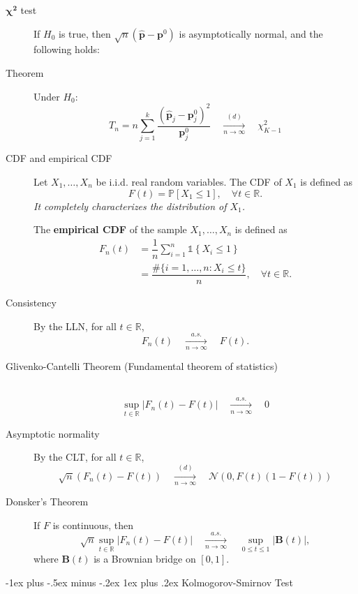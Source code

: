 \documentclass[a4paper, 10pt,landscape]{article}
\makeatletter
\renewcommand{\subsubsection}{\@startsection{subsubsection}{3}{0mm}%
                                {-1ex plus -.5ex minus -.2ex}%
                                {1ex plus .2ex}%
                                {\normalfont\small\bfseries}}
\makeatother
\begin{document}
\begin{multicols*}{3}
\begin{description}
\begin{itemize}
	\end{itemize}
	\item[$\mathbf{\chi^2}$ test] If $H_0$ is true, then $\sqrt{n}\left(\widehat{\mathbf{p}}-\mathbf{p}^0\right)$ is asymptotically normal, and the following holds:
	\item[Theorem] Under $H_0$:
	$$T_n=n\sum_{j=1}^{k}\dfrac{\left(\widehat{\mathbf{p}}_j-\mathbf{p}_j^0\right)^2}{\mathbf{p}_j^0}\quad\xrightarrow[n\rightarrow\infty]{(d)}\quad\chi_{K-1}^2$$
	\item[CDF and empirical CDF] Let $X_1,\dots,X_n$ be i.i.d. real random variables. The CDF of $X_1$ is defined as
	$$F(t)=\mathbb{P}\left[X_1\leq1\right],\quad\forall t\in\mathbb{R}.$$
	{\it It completely characterizes the distribution of $X_1$.}
	
	The {\bf empirical CDF} of the sample $X_1,\dots,X_n$ is defined as
	\begin{align*}
		F_n(t)&=\dfrac{1}{n}\sum_{i=1}^{n}\mathds{1}\left\{X_i\leq 1\right\}\\
		&=\dfrac{\#\{i=1,\dots,n:X_i\leq t\}}{n},\quad\forall t\in\mathbb{R}.
	\end{align*}
	\item[Consistency] By the LLN, for all $t\in\mathbb{R}$,
	$$F_n(t)\quad\xrightarrow[n\rightarrow\infty]{a.s.}\quad F(t).$$
	\item[Glivenko-Cantelli Theorem (Fundamental theorem of statistics)] ~
	$$\sup\limits_{t\in\mathbb{R}}\left|F_n(t)-F(t)\right|\quad\xrightarrow[n\rightarrow\infty]{a.s.}\quad0$$
	\item[Asymptotic normality] By the CLT, for all $t\in\mathbb{R}$,
	$$\sqrt{n}\left(F_n(t)-F(t)\right)\quad\xrightarrow[n\rightarrow\infty]{(d)}\quad\mathcal{N}\left(0,F(t)\left(1-F(t)\right)\right)$$
	\item[Donsker's Theorem] If $F$ is continuous, then
	$$\sqrt{n}\sup\limits_{t\in\mathbb{R}}\left|F_n(t)-F(t)\right|\quad\xrightarrow[n\rightarrow\infty]{a.s.}\quad\sup\limits_{0\leq t\leq 1}\left|\mathbf{B}(t)\right|,$$
	where $\mathbf{B}(t)$ is a Brownian bridge on $[0,1]$.
\end{description}

\subsubsection{Kolmogorov-Smirnov Test}


\end{multicols*}
\end{document}
